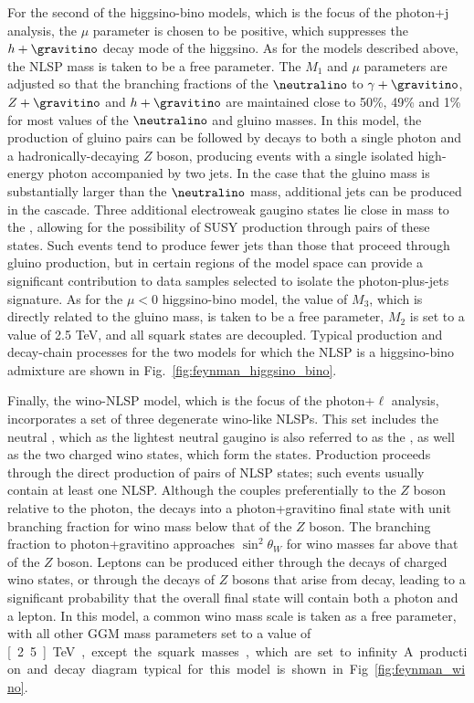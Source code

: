 For the second of the higgsino-bino models, which is
the focus of the photon+j analysis, the $\mu$ parameter is
chosen to be positive, which suppresses the $h + \gravitino$
decay mode of the higgsino. As for the models described above,
the NLSP mass is taken to be a
free parameter.
The $M_1$ and $\mu$ parameters are adjusted so that the branching
fractions of the $\neutralino$ to $\gamma + \gravitino$, $Z + \gravitino$
and $h + \gravitino$ are maintained close to 50\%, 49\% and 1\% for
most values of the $\neutralino$ and gluino masses.
In this model, the production of gluino pairs can be followed
by decays to both a single photon and a hadronically-decaying $Z$ boson, producing
events with a single isolated high-energy photon accompanied
by two jets.
In the case that the gluino mass is substantially
larger than the $\neutralino$ mass, additional jets can
be produced in the cascade.
Three additional electroweak gaugino states
lie close in mass to the \neutralino, allowing for the
possibility of SUSY production through pairs of these
states. Such events tend to produce
fewer jets than those that proceed through gluino production,
but in certain regions of the model space can provide a significant
contribution to data samples selected to isolate the photon-plus-jets
signature. As for the $\mu < 0$ higgsino-bino model, the value of $M_3$, which is directly
related to the gluino mass, is taken to be a free parameter, $M_2$ is
set to a value of 2.5 TeV, and all squark states are decoupled.
Typical production and decay-chain processes for the two models
for which the NLSP is a higgsino-bino admixture are shown in Fig.~\ref{fig:feynman_higgsino_bino}.


Finally, the wino-NLSP model, which is the focus of the photon+$\ell$ analysis,
incorporates a set of three degenerate wino-like
NLSPs. This set includes the neutral \winon, which as the lightest
neutral gaugino is also referred to as the \neutralino,
as well as the two charged wino states, which form the \chargino states.
Production proceeds
through the direct production of pairs of NLSP states;
such events usually contain at least one \winon NLSP. Although
the \winon couples preferentially to the $Z$ boson relative to
the photon, the \winon decays
into a photon+gravitino final state with unit branching fraction
for wino mass below that of the $Z$ boson.
The \winon branching fraction to photon+gravitino approaches
$\sin^2 \theta_W$ for wino masses far above that of the $Z$ boson.
Leptons can be produced either through the decays of charged wino
states, or through the decays of $Z$ bosons that arise from \winon
decay, leading to a significant probability that the overall final state
will contain both a photon and a lepton. In this model,
a common wino mass scale is taken as a free parameter, with
all other GGM mass parameters
set to a value of \unit[2.5]{TeV}, except the squark masses,
which are set to infinity.
A production and decay diagram typical for this model is shown in Fig.~\ref{fig:feynman_wino}.


